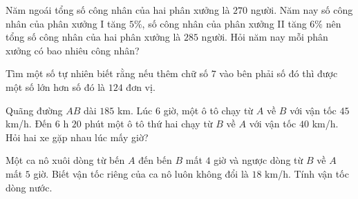 \begin{bt}%
Năm ngoái tổng số công nhân của hai phân xưởng là $270$ người. Năm nay số công nhân của phân xưởng I tăng $5\%$, số công nhân của phân xưởng II tăng $6\%$ nên tổng số công nhân của hai phân xưởng là $285$ người. Hỏi năm nay mỗi phân xưởng có bao nhiêu công nhân?
\end{bt}

\begin{bt}%
Tìm một số tự nhiên biết rằng nếu thêm chữ số $7$ vào bên phải số đó thì được một số lớn hơn số đó là $124$ đơn vị.
\end{bt}

\begin{bt}%
Quãng đường $AB$ dài $185$ km. Lúc $6$ giờ, một ô tô chạy từ $A$ về $B$ với vận tốc $45$ km/h. Đến $6$ h $20$ phút một ô tô thứ hai chạy từ $B$ về $A$ với vận tốc $40$ km/h. Hỏi hai xe gặp nhau lúc mấy giờ?
\end{bt}

\begin{bt}%
Một ca nô xuôi dòng từ bến $A$ đến bến $B$ mất $4$ giờ và ngược dòng từ $B$ về $A$ mất $5$ giờ. Biết vận tốc riêng của ca nô luôn không đổi là $18$ km/h. Tính vận tốc  dòng nước.
\end{bt}

